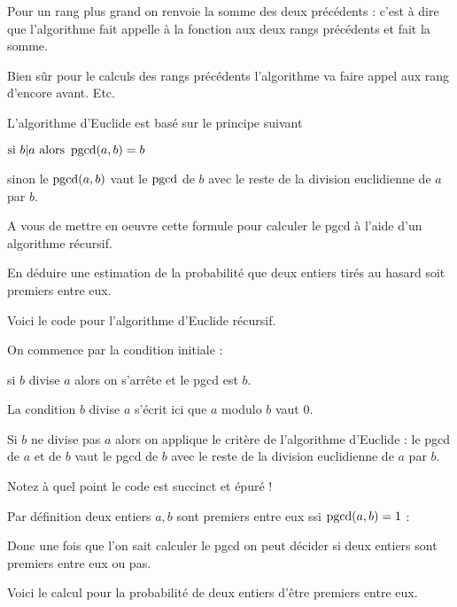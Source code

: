 \change

Pour un rang plus grand on renvoie la somme des deux précédents :
c'est à dire que l'algorithme fait appelle à la fonction aux deux rangs précédents et fait la somme.

Bien sûr pour le calculs des rangs précédents l'algorithme va faire appel aux rang d'encore avant. Etc.


\diapo

L’algorithme d'Euclide est basé sur le principe suivant

$\text{si } b | a \text{ alors } \mathop{\mathrm{pgcd}}\nolimits(a,b)=b$


sinon le $\mathop{\mathrm{pgcd}}\nolimits(a,b)$ vaut le $\mathop{\mathrm{pgcd}}\nolimits$ de $b$ avec 
le reste de la division euclidienne de $a$ par $b$.


\change

A vous de mettre en oeuvre cette formule pour calculer 
le pgcd à l'aide d'un algorithme récursif.

En déduire une estimation de la probabilité que deux entiers tirés
au hasard soit premiers entre eux.



\diapo

Voici le code pour l'algorithme d'Euclide récursif. 

On commence par la condition initiale :

si $b$ divise $a$ alors on s’arrête et le pgcd est $b$.

La condition $b$ divise $a$ s'écrit ici que $a$ modulo $b$ vaut $0$.

\change

Si $b$ ne divise pas $a$
alors on applique le critère de l'algorithme d'Euclide : 
le pgcd de $a$ et de $b$ vaut
le pgcd de $b$ avec le reste de la division euclidienne de $a$ par $b$.


Notez à quel point le code est succinct et épuré !


\diapo


Par définition deux entiers $a,b$ sont premiers entre eux ssi 
$\mathop{\mathrm{pgcd}}\nolimits(a,b)=1$ :

Donc une fois que l'on sait calculer le pgcd on peut décider 
si deux entiers sont premiers entre eux ou pas.


\change

Voici le calcul pour la probabilité 
de deux entiers d'être premiers entre eux.


